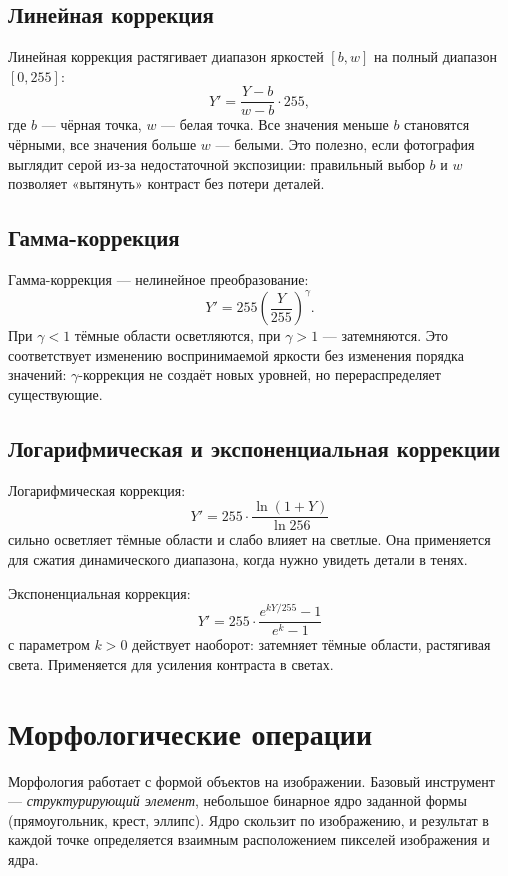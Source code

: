 \documentclass[a4paper,12pt]{article}
\begin{document}
\subsection{Линейная коррекция}

Линейная коррекция растягивает диапазон яркостей $[b, w]$ на полный диапазон $[0, 255]$:
\[
Y' = \frac{Y - b}{w - b} \cdot 255,
\]
где $b$ --- чёрная точка, $w$ --- белая точка. Все значения меньше $b$ становятся чёрными, все значения больше $w$ --- белыми. Это полезно, если фотография выглядит серой из-за недостаточной экспозиции: правильный выбор $b$ и $w$ позволяет «вытянуть» контраст без потери деталей.

\subsection{Гамма-коррекция}

Гамма-коррекция --- нелинейное преобразование:
\[
Y' = 255 \left(\frac{Y}{255}\right)^{\gamma}.
\]
При $\gamma < 1$ тёмные области осветляются, при $\gamma > 1$ --- затемняются. Это соответствует изменению воспринимаемой яркости без изменения порядка значений: $\gamma$-коррекция не создаёт новых уровней, но перераспределяет существующие.

\subsection{Логарифмическая и экспоненциальная коррекции}

Логарифмическая коррекция:
\[
Y' = 255 \cdot \frac{\ln(1 + Y)}{\ln 256}
\]
сильно осветляет тёмные области и слабо влияет на светлые. Она применяется для сжатия динамического диапазона, когда нужно увидеть детали в тенях.

Экспоненциальная коррекция:
\[
Y' = 255 \cdot \frac{e^{kY/255} - 1}{e^k - 1}
\]
с параметром $k > 0$ действует наоборот: затемняет тёмные области, растягивая света. Применяется для усиления контраста в светах.

\section{Морфологические операции}

Морфология работает с формой объектов на изображении. Базовый инструмент --- \emph{структурирующий элемент}, небольшое бинарное ядро заданной формы (прямоугольник, крест, эллипс). Ядро скользит по изображению, и результат в каждой точке определяется взаимным расположением пикселей изображения и ядра.
\end{document}

